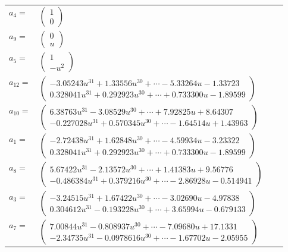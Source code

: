 \documentclass[1p]{elsarticle_modified}
\theoremstyle{definition}
\begin{document}
\begin{tabular}{m{7pt} m{180pt} m{7pt} m{180pt} }
\flushright $a_{4}=$&$\begin{pmatrix}1\\0\end{pmatrix}$ \\
\flushright $a_{9}=$&$\begin{pmatrix}0\\u\end{pmatrix}$ \\
\flushright $a_{5}=$&$\begin{pmatrix}1\\- u^2\end{pmatrix}$ \\
\flushright $a_{12}=$&$\begin{pmatrix}-3.05243 u^{31}+1.33556 u^{30}+\cdots-5.33264 u-1.33723\\0.328041 u^{31}+0.292923 u^{30}+\cdots+0.733300 u-1.89599\end{pmatrix}$ \\
\flushright $a_{10}=$&$\begin{pmatrix}6.38763 u^{31}-3.08529 u^{30}+\cdots+7.92825 u+8.64307\\-0.227028 u^{31}+0.570345 u^{30}+\cdots-1.64514 u+1.43963\end{pmatrix}$ \\
\flushright $a_{1}=$&$\begin{pmatrix}-2.72438 u^{31}+1.62848 u^{30}+\cdots-4.59934 u-3.23322\\0.328041 u^{31}+0.292923 u^{30}+\cdots+0.733300 u-1.89599\end{pmatrix}$ \\
\flushright $a_{8}=$&$\begin{pmatrix}5.67422 u^{31}-2.13572 u^{30}+\cdots+1.41383 u+9.56776\\-0.486384 u^{31}+0.379216 u^{30}+\cdots-2.86928 u-0.514941\end{pmatrix}$ \\
\flushright $a_{3}=$&$\begin{pmatrix}-3.24515 u^{31}+1.67422 u^{30}+\cdots-3.02690 u-4.97838\\0.304612 u^{31}-0.193228 u^{30}+\cdots+3.65994 u-0.679133\end{pmatrix}$ \\
\flushright $a_{7}=$&$\begin{pmatrix}7.00844 u^{31}-0.808937 u^{30}+\cdots-7.09680 u+17.1331\\-2.34735 u^{31}-0.0978616 u^{30}+\cdots-1.67702 u-2.05955\end{pmatrix}$ \\

\end{tabular}
\end{document}
